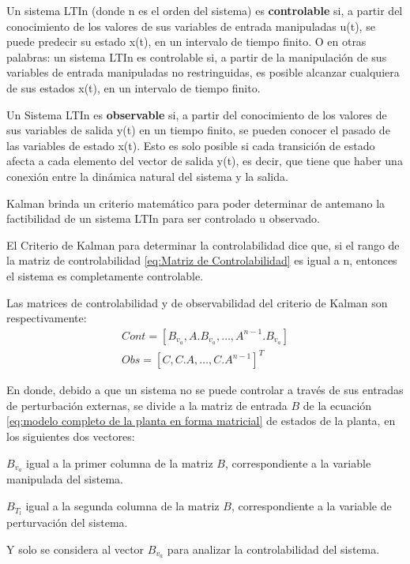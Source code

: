\documentclass{article}
\begin{document}
\begin{sloppypar}
Un sistema LTIn (donde n es el orden del sistema) es \textbf{controlable} si, a partir del conocimiento de los valores de sus variables de entrada manipuladas u(t), se puede predecir su estado x(t), en un intervalo de tiempo finito. O en otras palabras: un sistema LTIn es controlable si, a partir de la manipulación de sus variables de entrada manipuladas no restringuidas, es posible alcanzar cualquiera de sus estados x(t), en un intervalo de tiempo finito.

Un Sistema LTIn es \textbf{observable} si, a partir del conocimiento de los valores de sus variables de salida y(t) en un tiempo finito, se pueden conocer el pasado de las variables de estado x(t). Esto es solo posible si cada transición de estado afecta a cada elemento del vector de salida y(t), es decir, que tiene que haber una conexión entre la dinámica natural del sistema y la salida.

Kalman brinda un criterio matemático para poder determinar de antemano la factibilidad de un sistema LTIn para ser controlado u observado.

El Criterio de Kalman para determinar la controlabilidad dice que, si el rango de la matriz de controlabilidad \ref{eq:Matriz de Controlabilidad} es igual a n, entonces el sistema es completamente controlable.

Las matrices de controlabilidad y de observabilidad del criterio de Kalman son respectivamente:
\begin{subequations} \label{eq:Matrices de Controlabilidad y de Observabilidad}
	\begin{align}
        \label{eq:Matriz de Controlabilidad} Cont=\left[B_{v_a},A.B_{v_a},\ldots,A^{n-1}.B_{v_a}\right]
        \\
        \label{eq:Matriz de Observabilidad} Obs=\left[C,C.A,\ldots,C.A^{n-1}\right]^T
	\end{align}
\end{subequations}

En donde, debido a que un sistema no se puede controlar a través de sus entradas de perturbación externas, se divide a la matriz de entrada $B$ de la ecuación \ref{eq:modelo completo de la planta en forma matricial} de estados de la planta, en los siguientes dos vectores:
\begin{description}
    \item $B_{v_a}$ igual a la primer columna de la matriz $B$, correspondiente a la variable manipulada del sistema.
    \item $B_{T_l}$ igual a la segunda columna de la matriz $B$, correspondiente a la variable de perturvación del sistema.
\end{description}
Y solo se considera al vector $B_{v_a}$ para analizar la controlabilidad del sistema.


\end{sloppypar}
\end{document}
